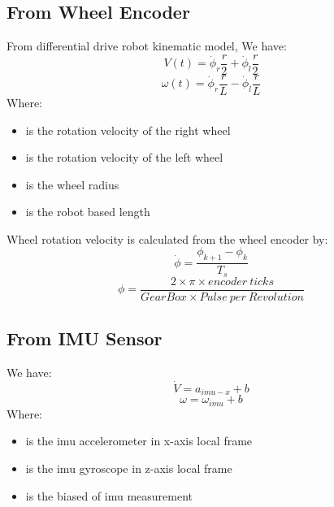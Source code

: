 \documentclass[12pt,a4paper]{article}
\begin{document}
	\subsection{From Wheel Encoder}
	From differential drive robot kinematic model, We have:
	\begin{equation}
		V(t) = \dot{\phi}_r \frac{r}{2} + \dot{\phi}_l \frac{r}{2}
		\label{eq2}
	\end{equation}
	\begin{equation}
		\omega(t) = \dot{\phi}_r \frac{r}{L} - \dot{\phi}_l \frac{r}{L}
		\label{eq3}
	\end{equation}
	Where:
	\begin{itemize}
		\item { is the rotation velocity of the right wheel}
		\item { is the rotation velocity of the left wheel}
		\item { is the wheel radius}
		\item { is the robot based length}
	\end{itemize}
	Wheel rotation velocity is calculated from the wheel encoder by:
	\begin{equation}
		\dot{\phi} = \frac{\phi_{k+1} - \phi_{k}}{T_s}
		\label{eq4}
	\end{equation}
	\begin{equation}
		\phi = \frac{2 \times \pi \times encoder\ ticks}{Gear Box \times Pulse\ per\ Revolution}
		\label{eq5}
	\end{equation}
	\subsection{From IMU Sensor}
	We have:
	\begin{equation}
		\dot{V} = a_{imu-x} + b
		\label{eq6}
	\end{equation}
	\begin{equation}
		\omega = \omega_{imu} + b
		\label{eq7}
	\end{equation}
	Where:
	\begin{itemize}
		\item { is the imu accelerometer in x-axis local frame }
		\item { is the imu gyroscope in z-axis local frame}
		\item { is the biased of imu measurement}
	\end{itemize}
\end{document}
